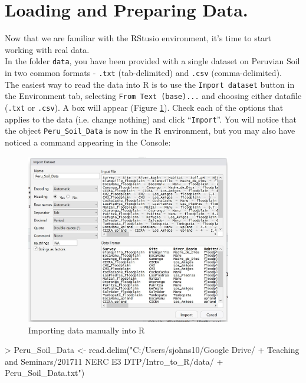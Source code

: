 \documentclass[a4paper,12pt]{article}
\begin{document}
\section {Loading and Preparing Data.}

Now that we are familiar with the RStusio environment, it's time to start working with real data. \\

In the folder \texttt{data}, you have been provided with a single dataset on Peruvian Soil in two common formats - \texttt{.txt} (tab-delimited) and \texttt{.csv} (comma-delimited). \\

The easiest way to read the data into R is to use the \texttt{Import dataset} button in the Environment tab, selecting \texttt{From Text (base)...} and choosing either datafile (\texttt{.txt} or \texttt{.csv}). A box will appear (Figure \ref{fig:Import_Dataset2}). Check each of the options that applies to the data (i.e. change nothing) and click ``\texttt{Import}''. You will notice that the object \texttt{Peru\_Soil\_Data} is now in the R environment, but you may also have noticed a command appearing in the Console: \\


\begin{figure}[t]
	\centering 
	\includegraphics[width=0.8\textwidth]{figs/Import_Dataset2.JPG}
	\caption{Importing data manually into R}
	\label{fig:Import_Dataset2}
\end{figure} 



\begin{shaded}
\begin{Schunk}
\begin{Sinput}
> Peru_Soil_Data <- read.delim("C:/Users/sjohns10/Google Drive/
+ Teaching and Seminars/201711 NERC E3 DTP/Intro_to_R/data/
+ Peru_Soil_Data.txt")
\end{Sinput}
\end{Schunk}
\end{shaded}
\end{document}
